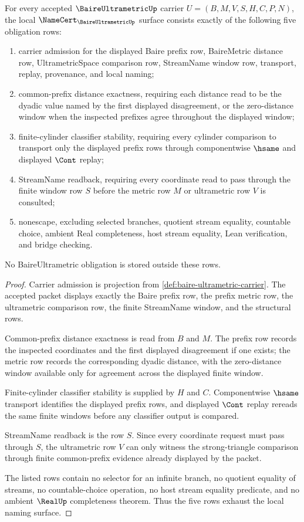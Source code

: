 \begin{theorem}
\label{thm:baire-ultrametric-namecert-obligations}
For every accepted $\BaireUltrametricUp$ carrier $U=(B,M,V,S,H,C,P,N)$, the local $\NameCert_{\BaireUltrametricUp}$ surface consists exactly of the following five obligation rows:
\begin{enumerate}
\item carrier admission for the displayed Baire prefix row, BaireMetric distance row, UltrametricSpace comparison row, StreamName window row, transport, replay, provenance, and local naming;
\item common-prefix distance exactness, requiring each distance read to be the dyadic value named by the first displayed disagreement, or the zero-distance window when the inspected prefixes agree throughout the displayed window;
\item finite-cylinder classifier stability, requiring every cylinder comparison to transport only the displayed prefix rows through componentwise $\hsame$ and displayed $\Cont$ replay;
\item StreamName readback, requiring every coordinate read to pass through the finite window row $S$ before the metric row $M$ or ultrametric row $V$ is consulted;
\item nonescape, excluding selected branches, quotient stream equality, countable choice, ambient Real completeness, host stream equality, Lean verification, and bridge checking.
\end{enumerate}
No BaireUltrametric obligation is stored outside these rows.
\end{theorem}
\begin{proof}
Carrier admission is projection from \autoref{def:baire-ultrametric-carrier}. The accepted packet displays exactly the Baire prefix row, the prefix metric row, the ultrametric comparison row, the finite StreamName window, and the structural rows.

Common-prefix distance exactness is read from $B$ and $M$. The prefix row records the inspected coordinates and the first displayed disagreement if one exists; the metric row records the corresponding dyadic distance, with the zero-distance window available only for agreement across the displayed finite window.

Finite-cylinder classifier stability is supplied by $H$ and $C$. Componentwise $\hsame$ transport identifies the displayed prefix rows, and displayed $\Cont$ replay rereads the same finite windows before any classifier output is compared.

StreamName readback is the row $S$. Since every coordinate request must pass through $S$, the ultrametric row $V$ can only witness the strong-triangle comparison through finite common-prefix evidence already displayed by the packet.

The listed rows contain no selector for an infinite branch, no quotient equality of streams, no countable-choice operation, no host stream equality predicate, and no ambient $\RealUp$ completeness theorem. Thus the five rows exhaust the local naming surface.
\end{proof}

